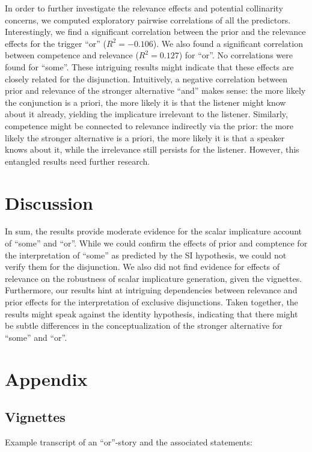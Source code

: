 \documentclass{sp}
\begin{document}
In order to further investigate the relevance effects and potential collinarity concerns, we computed exploratory pairwise correlations of all the predictors. Interestingly, we find a significant correlation between the prior and the relevance effects for the trigger ``or'' ($R^2 = -0.106$). We also found a significant correlation between competence and relevance ($R^2 = 0.127$) for ``or''. No correlations were found for ``some''. These intriguing results might indicate that these effects are closely related for the disjunction. Intuitively, a negative correlation between prior and relevance of the stronger alternative ``and'' makes sense: the more likely the conjunction is a priori, the more likely it is that the listener might know about it already, yielding the implicature irrelevant to the listener. Similarly, competence might be connected to relevance indirectly via the prior: the more likely the stronger alternative is a priori, the more likely it is that a speaker knows about it, while the irrelevance still persists for the listener. However, this entangled results need further research. 
 
\section{Discussion}
In sum, the results provide moderate evidence for the scalar implicature account of ``some'' and ``or''. While we could confirm the effects of prior and comptence for the interpretation of ``some'' as predicted by the SI hypothesis, we could not verify them for the disjunction. We also did not find evidence for effects of relevance on the robustness of scalar implicature generation, given the vignettes. Furthermore, our results hint at intriguing dependencies between relevance and prior effects for the interpretation of exclusive disjunctions. Taken together, the results might speak against the identity hypothesis, indicating that there might be subtle differences in the conceptualization of the stronger alternative for ``some'' and ``or''.

\section{Appendix}
\subsection{Vignettes}
Example transcript of an “or”-story and the associated statements:
\end{document}
